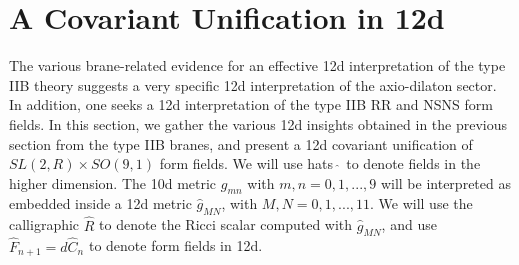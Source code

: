 \section{A Covariant Unification in 12d}
The various brane-related evidence for an effective 12d interpretation of the type IIB theory suggests a very specific 12d interpretation of the axio-dilaton sector.
In addition, one seeks a 12d interpretation of the type IIB RR and NSNS form fields.
In this section, we gather the various 12d insights obtained in the previous section from the type IIB branes, and present a 12d covariant unification of $SL(2,R)\times SO(9,1)$ form fields.
We will use hats $\hat{\;}$ to denote fields in the higher dimension.
The 10d metric $g_{mn}$ with $m,n=0,1,...,9$ will be interpreted as embedded inside a 12d metric $\hat{g}_{MN}$, with $M,N=0,1,...,11$. We will use the calligraphic $\hat R$ to denote the Ricci scalar computed with $\hat{g}_{MN}$, and use $\hat{F}_{n+1} = d\hat{C}_{n}$ to denote form fields in 12d.

